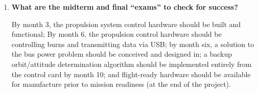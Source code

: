 \begin{enumerate}
     The timeline for this project is approximately one year.
  \item \textbf{What are the midterm and final ``exams'' to check for
    success?}\par
    By month 3, the propulsion system control hardware should be built and functional; By month 6, the propulsion control hardware should be controlling burns and transmitting data via USB; by month six, a solution to the bus power problem should be conceived and designed in; a backup orbit/attitude determination algorithm should be implemented entirely from the control card by month 10; and flight-ready hardware should be available for manufacture prior to mission readiness (at the end of the project).
\end{enumerate}
\endgroup

